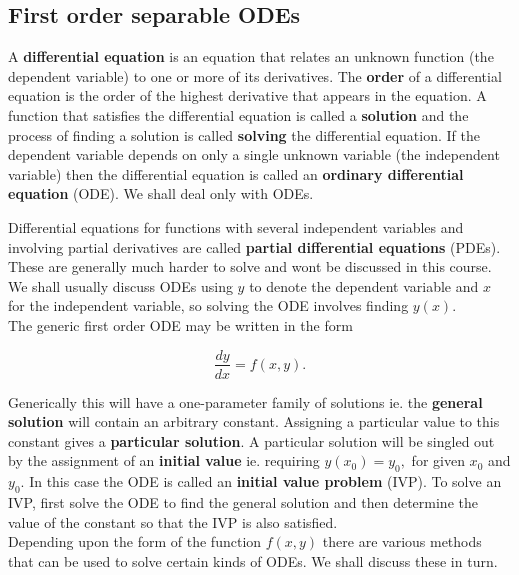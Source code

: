 \subsection{First order separable ODEs}
A \textbf{differential equation} is an equation that relates an unknown function (the dependent variable) to one or more of its derivatives. The \textbf{order} of a differential equation is the order of the highest derivative that appears in the equation. A function that satisfies the differential equation is called a \textbf{solution} and the process of finding a solution is called \textbf{solving} the differential equation. If the dependent variable depends on only a single unknown variable (the independent variable) then the differential equation is called an \textbf{ordinary differential equation} (ODE). We shall deal only with ODEs. 

Differential equations for functions with several independent variables and involving partial derivatives are called \textbf{partial differential equations} (PDEs). These are generally much harder to solve and wont be discussed in this course.\\

We shall usually discuss ODEs using $y$ to denote the dependent variable and $x$ for the independent variable, so solving the ODE involves finding $y(x).$\\

The generic first order ODE may be written in the form

\begin{equation}
    \label{eq:GFOO}
    \frac{dy}{dx}=f(x,y). \tag{$\star$}
\end{equation}

Generically this will have a one-parameter family of solutions ie. the \textbf{general solution} will contain an arbitrary constant. Assigning a particular value to this constant gives a \textbf{particular solution}. A particular solution will be singled out by the assignment of an \textbf{initial value} ie. requiring $y(x_0)=y_0,$ for given $x_0$ and $y_0.$ In this case the ODE is called an \textbf{initial value problem} (IVP). To solve an IVP, first solve the ODE to find the general solution and then determine the value of the constant so that the IVP is also satisfied.\\ 
 
Depending upon the form of the function $f(x,y)$ there are various methods that can be used to solve certain kinds of ODEs. We shall discuss these in turn.\\

